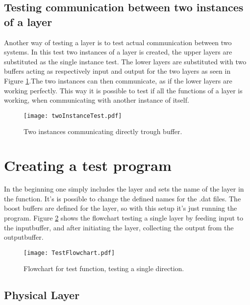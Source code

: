 \subsection{Testing communication between two instances of a layer}

Another way of testing a layer is to test actual communication between two systems. In this test two instances of a layer is created, the upper layers are substituted as the single instance test. The lower layers are substituted with two buffers acting as respectively  input and output for the two layers as seen in Figure \ref{fig:twoInstanceTest}.The two instances can then communicate, as if the lower layers are working perfectly. This way it is possible to test if all the functions of a layer is working, when communicating with another instance of itself.




\begin{figure}[htb]
	\begin{center}
	\texttt{[image: twoInstanceTest.pdf]}%
	\caption{Two instances communicating directly trough buffer.}
	\label{fig:twoInstanceTest}	
	\end{center}
\end{figure}



\section{Creating a test program}
In the beginning one simply includes the layer and sets the name of the layer in the function. It's is possible to change the defined names for the .dat files. The boost buffers are defined for the layer, so with this setup it's just running the program.
Figure \ref{fig:TestFlowchart} shows the flowchart testing a single layer by feeding input to the inputbuffer, and after initiating the layer, collecting the output from the outputbuffer. 


\begin{figure}[htb]
	\begin{center}
	\texttt{[image: TestFlowchart.pdf]}
	\caption{Flowchart for test function, testing a single direction.}
	\label{fig:TestFlowchart}	
	\end{center}
\end{figure}

\subsection{Physical Layer}

